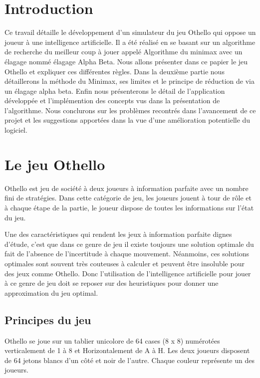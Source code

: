 \documentclass[11pt]{article}
\begin{document}
\section{Introduction}

Ce travail détaille le développement d'un simulateur du jeu Othello
qui oppose un joueur à une intelligence artificielle. Il a été
réalisé en se basant sur un algorithme de recherche du meilleur coup
à jouer appelé Algorithme du minimax avec un élagage nommé
élagage Alpha Beta. Nous allons présenter dans ce papier le jeu
Othello et expliquer ces différentes règles. Dans la deuxième
partie nous détaillerons la méthode du Minimax, ses limites et le
principe de réduction de via un élagage alpha beta. Enfin nous
présenterons le détail de l'application développée et
l'implémention des concepts vus dans la présentation de l'algorithme.
Nous conclurons sur les problèmes recontrés dans l'avancement de ce
projet et les suggestions apportées dans la vue d'une amélioration
potentielle du logiciel.

\section{Le jeu Othello}

Othello est jeu de société à deux joueurs à information
parfaite avec un nombre fini de stratégies. Dans cette catégorie de
jeu, les joueurs jouent à tour de rôle et à chaque étape de la
partie, le joueur dispose de toutes les informations sur l'état du jeu.

Une des caractéristiques qui rendent les jeux à information parfaite
dignes d'étude, c'est que dans ce genre de jeu il existe toujours une
solution optimale du fait de l'absence de l'incertitude à chaque
mouvement. Néanmoins, ces solutions optimales sont souvent très
couteuses à calculer et peuvent être insoluble pour des jeux comme
Othello. Donc l'utilisation de l'intelligence artificielle pour jouer à ce
genre de jeu doit se reposer sur des heuristiques pour donner une
approximation du jeu optimal.

\subsection{Principes du jeu}

Othello se joue sur un tablier unicolore de 64 cases (8 x 8)
numérotées verticalement de 1 à 8 et Horizontalement de A à H.
Les deux joueurs disposent de 64 jetons blancs d'un côté et noir de
l'autre. Chaque couleur représente un des joueurs.
\end{document}
